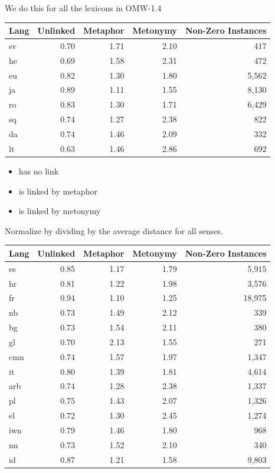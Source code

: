 \documentclass[xetex]{beamer}
\begin{document}
\begin{frame}[allowframebreaks]{We do this for all the lexicons in OMW-1.4}

 
  \begin{center}
  \begin{tabular}{lrrrr}
    Lang & Unlinked & Metaphor & Metonymy & Non-Zero Instances \\ \hline
sv & 0.70 & 1.71 & 2.10 & 417   \\
he & 0.69 & 1.58 & 2.31 & 472   \\
eu & 0.82 & 1.30 & 1.80 & 5,562  \\
ja & 0.89 & 1.11 & 1.55 & 8,130 \\
ro & 0.83 & 1.30 & 1.71 & 6,429 \\
sq & 0.74 & 1.27 & 2.38 & 822 \\
da & 0.74 & 1.46 & 2.09 & 332 \\
lt & 0.63 & 1.46 & 2.86 & 692 \\
 \end{tabular}
\end{center}

\begin{itemize}
\item {} has no link
\item {} is linked by metaphor
\item {} is linked by metonymy
\end{itemize}
Normalize by dividing  by the average distance for all senses.

  \begin{center}
  \begin{tabular}{lrrrr}
    Lang & Unlinked & Metaphor & Metonymy & Non-Zero Instances \\ \hline
es & 0.85 & 1.17 & 1.79 & 5,915 \\
 hr & 0.81 & 1.22 & 1.98 & 3,576 \\
    fr & 0.94 & 1.10 & 1.25 & 18,975 \\
nb & 0.73 & 1.49 & 2.12 & 339 \\
bg & 0.73 & 1.54 & 2.11 & 380 \\
gl & 0.70 & 2.13 & 1.55 & 271 \\
cmn & 0.74 & 1.57 & 1.97 & 1,347 \\
it & 0.80 & 1.39 & 1.81 & 4,614 \\
arb & 0.74 & 1.28 & 2.38 & 1,337 \\
pl & 0.75 & 1.43 & 2.07 & 1,326 \\
el & 0.72 & 1.30 & 2.45 & 1,274 \\
iwn & 0.79 & 1.46 & 1.80 & 968 \\
nn & 0.73 & 1.52 & 2.10 & 340 \\
id & 0.87 & 1.21 & 1.58 & 9,803 \\
  \end{tabular}
\end{center}


\end{frame}
\end{document}
